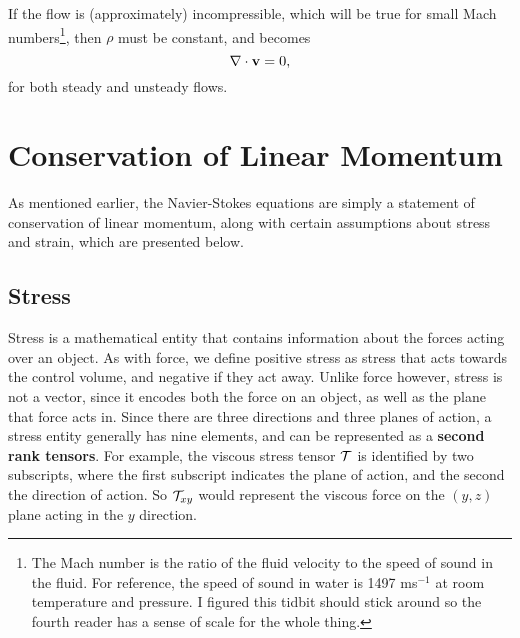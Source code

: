 If the flow is (approximately) incompressible, which will be true for small Mach numbers\footnote{The Mach number is the ratio of the fluid velocity to the speed of sound in the fluid. For reference, the speed of sound in water is 1497 ms$^{-1}$ at room temperature and pressure. I figured this tidbit should stick around so the fourth reader has a sense of scale for the whole thing.}, then $\rho$ must be constant, and  becomes 
\begin{equation}\label{eq:consMassIncomp}
\nabla\cdot\mathbf{v} = 0,
\end{equation}
for both steady and unsteady flows.

\section{Conservation of Linear Momentum} 

As mentioned earlier, the Navier-Stokes equations are simply a statement of conservation of linear momentum, along with certain assumptions about stress  and strain, which are presented below. 
\subsection{Stress}

Stress is a mathematical entity that contains information about the forces acting over an object. As with force, we define positive stress as stress that acts towards the control volume, and negative if they act away. Unlike force however, stress is not a vector, since it encodes both the force on an object, as well as the plane that force acts in. Since there are three directions and three planes of action, a stress entity generally has nine elements, and can be represented as a {\bf second rank tensors}. For example, the viscous stress tensor $\mathcal{T}$ is identified by two subscripts, where the first subscript indicates the plane of action, and the second the direction of action. So $\mathcal{T}_{xy}$ would represent the viscous force on the $(y,z)$ plane acting in the $y$ direction. 

